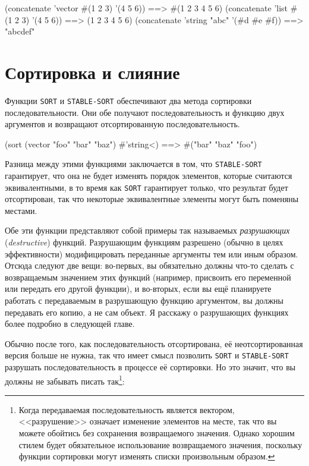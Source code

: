 \begin{myverb}
  (concatenate 'vector #(1 2 3) '(4 5 6))    ==> #(1 2 3 4 5 6)
  (concatenate 'list #(1 2 3) '(4 5 6))      ==> (1 2 3 4 5 6)
  (concatenate 'string "abc" '(#\bslash{}d #\bslash{}e #\bslash{}f)) ==> "abcdef"
\end{myverb}

\section{Сортировка и слияние}

Функции \lstinline{SORT} и \lstinline{STABLE-SORT} обеспечивают два метода сортировки
последовательности.  Они обе получают последовательность и функцию двух аргументов и
возвращают отсортированную последовательность.

\begin{myverb}
  (sort (vector "foo" "bar" "baz") #'string<) ==> #("bar" "baz" "foo")
\end{myverb}

Разница между этими функциями заключается в том, что \lstinline{STABLE-SORT} гарантирует, что
она не будет изменять порядок элементов, которые считаются эквивалентными, в то время как
\lstinline{SORT} гарантирует только, что результат будет отсортирован, так что некоторые
эквивалентные элементы могут быть поменяны местами.

Обе эти функции представляют собой примеры так называемых \textit{разрушающих} (\textit{destructive}) функций.  Разрушающим
функциям разрешено (обычно в целях эффективности) модифицировать переданные аргументы тем
или иным образом.  Отсюда следуют две вещи: во-первых, вы обязательно должны что-то сделать с
возвращаемым значением этих функций (например, присвоить его переменной или передать его
другой функции), и во-вторых, если вы ещё планируете работать с передаваемым в
разрушающую функцию аргументом, вы должны передавать его копию, а не сам объект.
Я расскажу о разрушающих функциях более подробно в следующей главе.

Обычно после того, как последовательность отсортирована, её неотсортированная версия
больше не нужна, так что имеет смысл
позволить \lstinline{SORT} и \lstinline{STABLE-SORT} разрушать последовательность в процессе её
сортировки.  Но это значит, что вы должны не забывать писать так\footnote{Когда
  передаваемая последовательность является вектором, <<разрушение>> означает изменение
  элементов на месте, так что вы можете обойтись без сохранения возвращаемого значения.
  Однако хорошим стилем будет обязательное использование возвращаемого значения,
  поскольку функции сортировки могут изменять списки произвольным образом.}:

